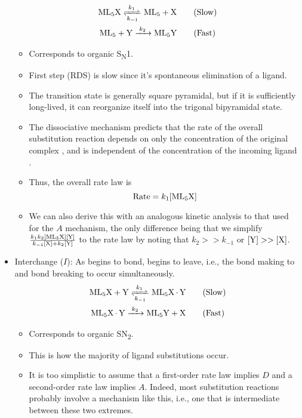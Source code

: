 \documentclass[../notes.tex]{subfiles}
\begin{document}
\begin{itemize}
    \begin{gather*}
        \ce{ML5X <=>[$k_1$][$k_{-1}$] ML5 + X}\tag{Slow}\\
        \ce{ML5 + Y ->[$k_2$] ML5Y}\tag{Fast}
    \end{gather*}
    \begin{itemize}
        \item Corresponds to organic S\textsubscript{N}1.
        \item First step (RDS) is slow since it's spontaneous elimination of a ligand.
        \item The transition state is generally square pyramidal, but if it is sufficiently long-lived, it can reorganize itself into the trigonal bipyramidal state.
        \item The dissociative mechanism predicts that the rate of the overall substitution reaction depends on only the concentration of  the original complex \ce{[ML5X]}, and is independent of the concentration of the incoming ligand \ce{[Y]}.
        \item Thus, the overall rate law is
        \begin{equation*}
            \text{Rate} = k_1\ce{[ML5X]}
        \end{equation*}
        \item We can also derive this with an analogous kinetic analysis to that used for the $A$ mechanism, the only difference being that we simplify $\frac{k_1k_2\ce{[ML5X][Y]}}{k_{-1}\ce{[X]}+k_2\ce{[Y]}}$ to the rate law by noting that $k_2>>k_{-1}$ or $\ce{[Y]}>>\ce{[X]}$.
    \end{itemize}
    \item Interchange ($I$): As  begins to bond,  begins to leave, i.e., the bond making to  and bond breaking to  occur simultaneously.
    \begin{gather*}
        \ce{ML5X + Y <=>[$k_1$][$k_{-1}$] ML5X*Y}\tag{Slow}\\
        \ce{ML5X*Y ->[$k_2$] ML5Y + X}\tag{Fast}
    \end{gather*}
    \begin{itemize}
        \item Corresponds to organic SN\textsubscript{2}.
        \item This is how the majority of ligand substitutions occur.
        \item It is too simplistic to assume that a first-order rate law implies $D$ and a second-order rate law implies $A$. Indeed, most substitution reactions probably involve a mechanism like this, i.e., one that is intermediate between these two extremes.

\end{itemize}
\end{itemize}
\end{document}
